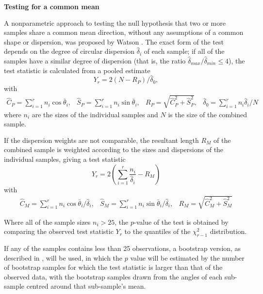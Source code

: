 \documentclass[../../ArchStats.tex]{subfiles}
\begin{document}
\textbf{Testing for a common mean}

A nonparametric approach to testing the null hypothesis that two or more samples share a common mean direction, without any assumptions of a common shape or dispersion, was proposed by Watson .  The exact form of the test depends on the degree of circular dispersion $\hat{\delta}_i$ of each sample; if all of the samples have a similar degree of dispersion (that is, the ratio $\hat{\delta}_{max} / \hat{\delta}_{min} \leq 4$), the test statistic is calculated from a pooled estimate
\[Y_r = 2(N - R_P) / \hat{\delta}_0,\]
with
\[\begin{matrix*}
\hat{C}_P = \sum_{i=1}^r n_i \cos \bar{\theta}_i, &
\hat{S}_P = \sum_{i=1}^r n_i \sin \bar{\theta}_i, &
R_P = \sqrt{\hat{C}_P^2 + \hat{S}_P^2}, &
\hat{\delta}_0 = \sum_{i=1}^r n_i \hat{\delta}_i / N
\end{matrix*}\]
where $n_i$ are the sizes of the individual samples and $N$ is the size of the combined sample.

If the dispersion weights are not comparable, the resultant length $R_M$ of the combined sample is weighted according to the sizes and dispersions of the individual samples, giving a test statistic
\[Y_r = 2\left(\sum_{i=1}^r \frac{n_i}{\hat{\delta}_i} - R_M\right)\]
with 
\[\begin{matrix*}
\hat{C}_M = \sum_{i=1}^r n_i \cos \bar{\theta}_i / \hat{\delta}_i, &
\hat{S}_M = \sum_{i=1}^r n_i \sin \bar{\theta}_i / \hat{\delta}_i, &
R_M = \sqrt{\hat{C}_M^2 + \hat{S}_M^2}
\end{matrix*}\]

Where all of the sample sizes $n_i > 25$, the $p$-value of the test is obtained by comparing the observed test statistic $Y_r$ to the quantiles of the $\chi^2_{r-1}$ distribution. 

If any of the samples contains less than 25 observations, a bootstrap version, as described in \cite[section 8.4.4]{Fisher1993}, will be used, in which the $p$ value will be estimated by the number of bootstrap samples for which the test statistic is larger than that of the observed data, with the bootstrap samples drawn from the angles of each sub-sample centred around that sub-sample's mean. 

\end{document}
